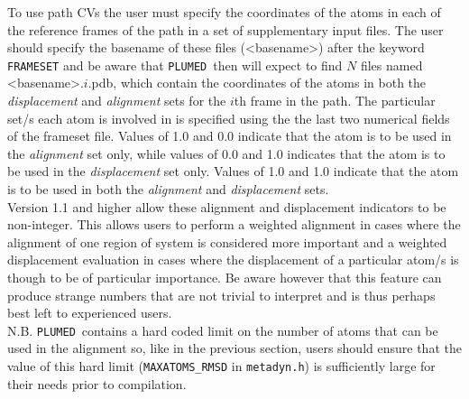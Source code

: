 \documentclass[12pt,fleqn]{report}
\newcommand{\plumed}{{\tt PLUMED}}
\begin{document}
 To use path CVs the user must specify the coordinates of the atoms in each of the reference frames 
 of the path in a set of supplementary input files.  The user should specify the basename of these 
 files (<basename>) after the keyword {\tt FRAMESET} and be aware that \plumed\ then will expect to find $N$ files named
 <basename>.$i$.pdb, which contain the coordinates of the atoms in both the {\it displacement} and {\it alignment} sets
 for the $i$th frame in the path.  The particular set/s each atom is involved in is specified using the the last two 
 numerical fields of the frameset file.  Values of 1.0 and 0.0 indicate that the atom is to be used in the 
 {\it alignment} set only, while values of 0.0 and 1.0 indicates that the atom is to be used in the {\it displacement} set
 only.  Values of 1.0 and 1.0 indicate that the atom is to be used in both the {\it alignment} and {\it displacement} sets.
\\
Version 1.1 and higher allow these alignment and displacement indicators to be non-integer.
This allows users to perform a weighted alignment in cases where the alignment of one region of system is considered more important 
and a weighted displacement evaluation in cases where the displacement of a particular atom/s is though to be of particular importance. 
Be aware however that this feature can produce strange numbers that are not trivial to interpret and is thus perhaps best left to experienced users. 
\\
N.B. \plumed \ contains a hard coded limit on the number of atoms that can be used in the alignment so, like in the previous section, users should
ensure that the value of this hard limit ({\tt MAXATOMS\_RMSD} in {\tt metadyn.h}) is sufficiently large for their needs prior to compilation.   
\end{document}
